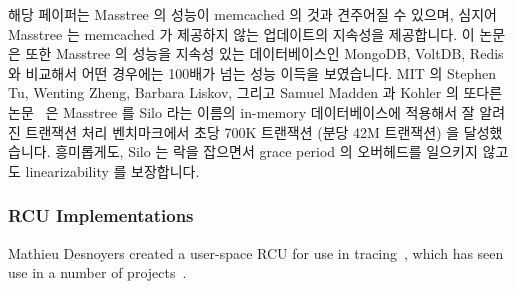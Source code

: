 해당 페이퍼는 Masstree 의 성능이 memcached 의 것과 견주어질 수 있으며, 심지어
Masstree 는 memcached 가 제공하지 않는 업데이트의 지속성을 제공합니다.
이 논문은 또한 Masstree 의 성능을 지속성 있는 데이터베이스인 MongoDB, VoltDB,
Redis 와 비교해서 어떤 경우에는 100배가 넘는 성능 이득을 보였습니다.
MIT 의 Stephen Tu, Wenting Zheng, Barbara Liskov, 그리고 Samuel Madden 과
Kohler 의 또다른 논문~\cite{Tu:2013:STM:2517349.2522713} 은 Masstree 를 Silo
라는 이름의 in-memory 데이터베이스에 적용해서 잘 알려진 트랜잭션 처리
벤치마크에서 초당 700K 트랜잭션 (분당 42M 트랜잭션) 을 달성했습니다.
흥미롭게도, Silo 는 락을 잡으면서 grace period 의 오버헤드를 일으키지 않고도
linearizability 를 보장합니다.
\iffalse

Yandong Mao and Robert Morris of MIT and Eddie Kohler of
Harvard University created another RCU-protected tree named
Masstree~\cite{Mao:2012:CCF:2168836.2168855} that combines ideas from B+
trees and tries.
Although this tree is about 2.5x slower than an RCU-protected hash table,
it supports operations on key ranges, unlike hash tables.
In addition, Masstree supports efficient storage of objects with long
shared key prefixes and, furthermore, provides persistence via logging
to mass storage.

The paper notes that Masstree's performance rivals that of memcached, even
given that Masstree is persistently storing updates and memcached is not.
The paper also compares Masstree's performance to the persistent
datastores MongoDB, VoltDB, and Redis, reporting significant performance
advantages for Masstree, in some cases exceeding two orders of magnitude.
Another paper~\cite{Tu:2013:STM:2517349.2522713}, by Stephen Tu,
Wenting Zheng, Barbara Liskov, and Samuel Madden of MIT and Kohler,
applies Masstree to an in-memory database named Silo, achieving 700K
transactions per second (42M transactions per minute) on a well-known
transaction-processing benchmark.
Interestingly enough, Silo guarantees linearizability without incurring
the overhead of grace periods while holding locks.
\fi

\subsubsection{RCU Implementations}
\label{sec:defer:RCU Implementations}

Mathieu Desnoyers created a user-space RCU for use in
tracing~\cite{MathieuDesnoyersPhD,MathieuDesnoyers2012URCU},
which has seen use in a number of projects~\cite{MikeDay2013RCUqemu}.

